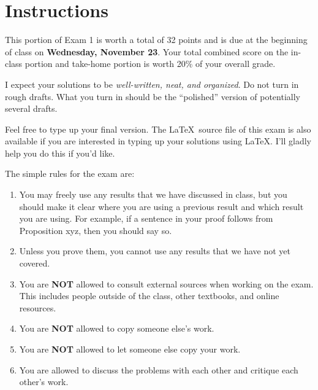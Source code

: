 \documentclass[11pt]{scrartcl}
\theoremstyle{definition}
\begin{document}
\begin{center}

  
  \bigskip
  

\end{center}

\section*{Instructions}

This portion of Exam 1 is worth a total of 32 points and is due at the beginning of class on \textbf{Wednesday, November 23}.  Your total combined score on the in-class portion and take-home portion is worth 20\% of your overall grade.  

\bigskip

I expect your solutions to be \emph{well-written, neat, and organized}.  Do not turn in rough drafts.  What you turn in should be the ``polished'' version of potentially several drafts.  
 
\bigskip

Feel free to type up your final version.  The \LaTeX\ source file of this exam is also available if you are interested in typing up your solutions using \LaTeX.  I'll gladly help you do this if you'd like.

\bigskip

The simple rules for the exam are:

\begin{enumerate}
\item You may freely use any results that we have discussed in class, but you should make it clear where you are using a previous result and which result you are using.  For example, if a sentence in your proof follows from Proposition xyz, then you should say so. 
\item Unless you prove them, you cannot use any results that we have not yet covered.
\item You are \textbf{NOT} allowed to consult external sources when working on the exam.  This includes people outside of the class, other textbooks, and online resources.
\item You are \textbf{NOT} allowed to copy someone else's work.
\item You are \textbf{NOT} allowed to let someone else copy your work.
\item You are allowed to discuss the problems with each other and critique each other's work.
\end{enumerate}
\end{document}
